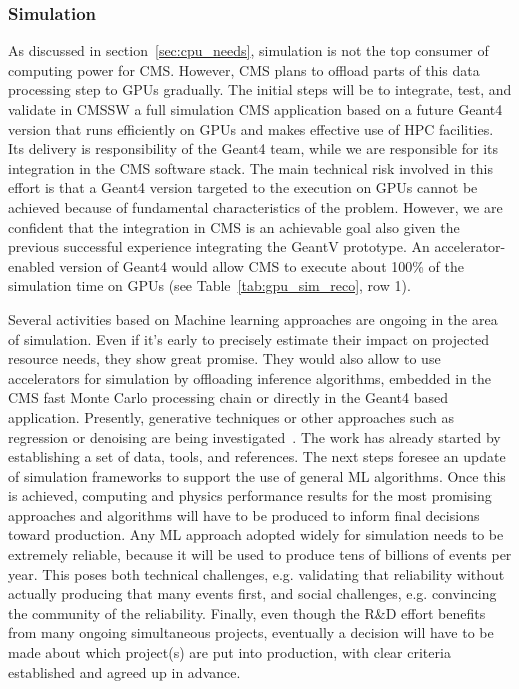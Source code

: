 \documentclass{cmspaper}
\begin{document}
\subsubsection{Simulation}
As discussed in section~\ref{sec:cpu_needs}, simulation is not the top consumer of computing power for CMS. However, CMS plans to offload parts of this data processing step to GPUs gradually. The initial steps will be to integrate, test, and validate in CMSSW a full simulation CMS application based on a future Geant4 version that runs efficiently on GPUs and makes effective use of HPC facilities. Its delivery is responsibility of the Geant4 team, while we are responsible for its integration in the CMS software stack. The main technical risk involved in this effort is that a Geant4 version targeted to the execution on GPUs cannot be achieved because of fundamental characteristics of the problem. However, we are confident that the integration in CMS is an achievable goal also given the previous successful experience integrating the GeantV prototype\cite{Pedro:2715335}. An accelerator-enabled version of Geant4 would allow CMS to execute about 100\% of the simulation time on GPUs (see Table~\ref{tab:gpu_sim_reco}, row 1).

Several activities based on Machine learning approaches are ongoing in the area of simulation. Even if it's early to precisely estimate their impact on projected resource needs, they show great promise.
They would also allow to use accelerators for simulation by offloading inference algorithms, embedded in the CMS fast Monte Carlo processing chain or directly in the Geant4 based application. Presently, generative techniques or other approaches such as regression or denoising are being investigated~\cite{Belayneh_2020, Erdmann_2019, butter2021ganplifying}. The work has already started by establishing a set of data, tools, and references. The next steps foresee an update of simulation frameworks to support the use of general ML algorithms. Once this is achieved, computing and physics performance results for the most promising approaches and algorithms will have to be produced to inform final decisions toward production. Any ML approach adopted widely for simulation needs to be extremely reliable, because it will be used to produce tens of billions of events per year. This poses both technical challenges, e.g. validating that reliability without actually producing that many events first, and social challenges, e.g. convincing the community of the reliability. 
Finally, even though the R\&D effort benefits from many ongoing simultaneous projects, eventually a decision will have to be made about which project(s) are put into production, with clear criteria established and agreed up in advance.
\end{document}
